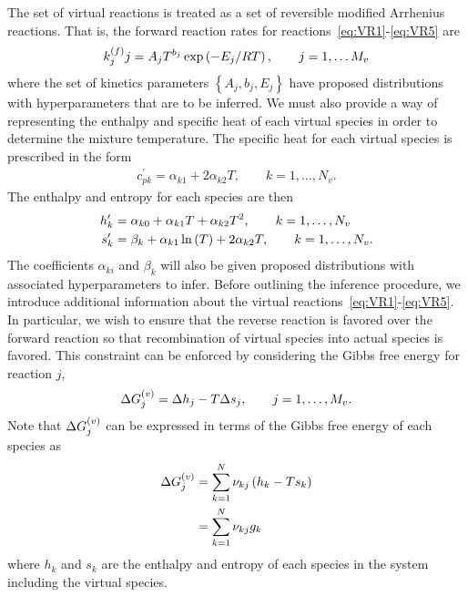 \documentclass[fontsize=12pt, %
               paper=a4, %
               hyperref]{report}
\begin{document}
  The set of virtual reactions is treated as a set of reversible 
  modified Arrhenius reactions.  That is, the forward reaction 
  rates for reactions~\eqref{eq:VR1}-\eqref{eq:VR5} are 
  \begin{align}
    k_{j}^{\left(f\right)}{j} = A_{j}T^{b_{j}}\exp\left(-E_{j}/RT\right), \qquad j = 1,\ldots M_{v}
  \end{align}
  where the set of kinetics parameters $\left\{A_{j}, b_{j}, E_{j}\right\}$ 
  have proposed distributions with hyperparameters that are to be 
  inferred.  We must also provide a way of representing the 
  enthalpy and specific heat of each virtual species in order to 
  determine the mixture temperature.  The 
  specific heat for each virtual species is prescribed in the form
  \begin{align}
    c_{pk}^{\prime} = \alpha_{k1} + 2\alpha_{k2}T, \qquad k = 1,\ldots,N_{v}.
  \end{align} 
  The enthalpy and entropy for each species are then 
  \begin{align}
    h_{k}^{\prime} &= \alpha_{k0} + \alpha_{k1}T + \alpha_{k2}T^{2}, 
      \qquad k = 1,\ldots,N_{v} \\
    s_{k}^{\prime} &= \beta_{k} + \alpha_{k1}\ln\left(T\right) + 2\alpha_{k2}T, 
      \qquad k = 1,\ldots,N_{v}.
  \end{align}
  The coefficients $\alpha_{ki}$ and $\beta_{k}$ will also be
  given proposed distributions with associated hyperparameters 
  to infer.  Before outlining the inference procedure, we 
  introduce additional information about the virtual 
  reactions~\eqref{eq:VR1}-\eqref{eq:VR5}.  In particular, 
  we wish to ensure that the reverse reaction is favored 
  over the forward reaction so that recombination of 
  virtual species into actual species is favored.  This constraint 
  can be enforced by considering the Gibbs free energy for reaction 
  $j$, 
  \begin{align}
    \Delta G_{j}^{\left(v\right)}= \Delta h_{j} - T \Delta s_{j}, 
      \qquad j = 1, \ldots, M_{v}.
  \end{align}
  Note that $\Delta G_{j}^{\left(v\right)}$ can be expressed in terms of the 
  Gibbs free energy of each species as 
  \begin{align}
    \Delta G_{j}^{\left(v\right)} &= \sum_{k=1}^{N}{\nu_{kj}\left(h_{k} - T s_{k}\right)} \\
                 &= \sum_{k=1}^{N}{\nu_{kj}g_{k}}
  \end{align}
  where $h_{k}$ and $s_{k}$ are the enthalpy and entropy of 
  each species in the system including the virtual species.
\end{document}
